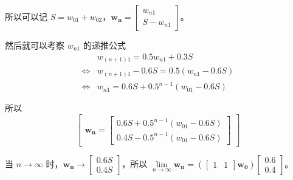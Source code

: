 	所以可以记 $S=w_{01}+w_{02}$，$\boldsymbol{w_n}=\begin{bmatrix}
		w_{n1}\\S-w_{n1}
	\end{bmatrix}$。
	
	然后就可以考察 $w_{n1}$ 的递推公式
	\begin{align*}
		&w_{(n+1)1}=0.5w_{n1}+0.3S\\
		\Leftrightarrow& w_{(n+1)1}-0.6S = 0.5(w_{n1}-0.6S)\\
		\Leftrightarrow& w_{n1}=0.6S+0.5^{n-1}(w_{01}-0.6S)
	\end{align*}
	
	所以
	\[
		\begin{bmatrix}
			\boldsymbol{w_n}=\begin{bmatrix}
				0.6S+0.5^{n-1}(w_{01}-0.6S)\\
				0.4S-0.5^{n-1}(w_{01}-0.6S)
			\end{bmatrix}
		\end{bmatrix}
	\]

	当 $n\rightarrow \infty$ 时，$\boldsymbol{w_n}\rightarrow\begin{bmatrix}
		0.6S\\0.4S
	\end{bmatrix}$，所以 $\lim\limits_{n\rightarrow\infty}\boldsymbol{w_n}=\left(\begin{bmatrix}
	1&1
	\end{bmatrix}\boldsymbol{w_0}\right)\begin{bmatrix}
		0.6\\0.4
	\end{bmatrix}$。
\


